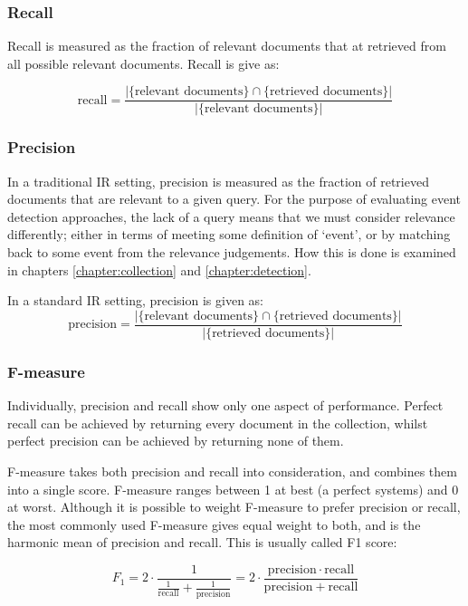 \subsubsection{Recall}

Recall is measured as the fraction of relevant documents that at retrieved from all possible relevant documents. Recall is give as:

\begin{displaymath}
	\text{recall}=\frac{|\{\text{relevant documents}\}\cap\{\text{retrieved documents}\}|}{|\{\text{relevant documents}\}|}
\end{displaymath}

\subsubsection{Precision}
In a traditional IR setting, precision is measured as the fraction of retrieved documents that are relevant to a given query.
For the purpose of evaluating event detection approaches, the lack of a query means that we must consider relevance differently; either in terms of meeting some definition of `event', or by matching back to some event from the relevance judgements.
How this is done is examined in chapters \ref{chapter:collection} and \ref{chapter:detection}.

In a standard IR setting, precision is given as:
\begin{displaymath}
	\text{precision}=\frac{|\{\text{relevant documents}\}\cap\{\text{retrieved documents}\}|}{|\{\text{retrieved documents}\}|}
\end{displaymath}

\subsubsection{F-measure}
Individually, precision and recall show only one aspect of performance.
Perfect recall can be achieved by returning every document in the collection,
whilst perfect precision can be achieved by returning none of them.

F-measure takes both precision and recall into consideration, and combines them into a single score. F-measure ranges between 1 at best (a perfect systems) and 0 at worst. Although it is possible to weight F-measure to prefer precision or recall, the most commonly used F-measure gives equal weight to both, and is the harmonic mean of precision and recall. This is usually called F1 score:

\begin{displaymath}
	F_1 = 2 \cdot \frac{1}{\tfrac{1}{\mathrm{recall}} + \tfrac{1}{\mathrm{precision}}} = 2 \cdot \frac{\mathrm{precision} \cdot \mathrm{recall}}{\mathrm{precision} + \mathrm{recall}}
\end{displaymath}

